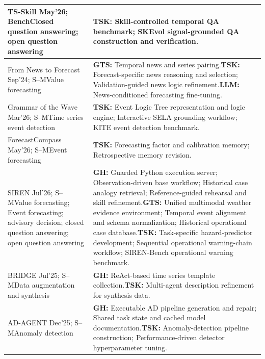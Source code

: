 \documentclass[preprints,article,submit,moreauthors]{Definitions/mdpi}
\newcommand{\typeSMshort}{\textsf{S--M}}
\newcommand{\typeBenchshort}{\textsf{Bench}}
\begin{document}
\begin{longtable}{@{}>{\raggedright\arraybackslash}p{}p{}@{}}
TS-Skill \citep{tsskill2026} May'26; \typeBenchshort{}\newline Closed question answering; open question answering & \textbf{TSK:} Skill-controlled temporal QA benchmark; SKEvol signal-grounded QA construction and verification.\\\midrule
From News to Forecast \citep{fromnewstoforecast2024} Sep'24; \typeSMshort{}\newline Value forecasting & \textbf{GTS:} Temporal news and series pairing.\newline\textbf{TSK:} Forecast-specific news reasoning and selection; Validation-guided news logic refinement.\newline\textbf{LLM:} News-conditioned forecasting fine-tuning.\\\midrule
Grammar of the Wave \citep{grammarwave2026} Mar'26; \typeSMshort{}\newline Time series event detection & \textbf{TSK:} Event Logic Tree representation and logic engine; Interactive SELA grounding workflow; KITE event detection benchmark.\\\midrule
ForecastCompass \citep{forecastcompass2026} May'26; \typeSMshort{}\newline Event forecasting & \textbf{TSK:} Forecasting factor and calibration memory; Retrospective memory revision.\\\midrule
SIREN \citep{siren2026} Jul'26; \typeSMshort{}\newline Value forecasting; Event forecasting; advisory decision; closed question answering; open question answering & \textbf{GH:} Guarded Python execution server; Observation-driven base workflow; Historical case analogy retrieval; Reference-guided rehearsal and skill refinement.\newline\textbf{GTS:} Unified multimodal weather evidence environment; Temporal event alignment and schema normalization; Historical operational case database.\newline\textbf{TSK:} Task-specific hazard-predictor development; Sequential operational warning-chain workflow; SIREN-Bench operational warning benchmark.\\\midrule
BRIDGE \citep{bridge2025} Jul'25; \typeSMshort{}\newline Data augmentation and synthesis & \textbf{GH:} ReAct-based time series template collection.\newline\textbf{TSK:} Multi-agent description refinement for synthesis data.\\\midrule
AD-AGENT \citep{adagent2025} Dec'25; \typeSMshort{}\newline Anomaly detection & \textbf{GH:} Executable AD pipeline generation and repair; Shared task state and cached model documentation.\newline\textbf{TSK:} Anomaly-detection pipeline construction; Performance-driven detector hyperparameter tuning.\\\midrule

\end{longtable}
\end{document}
